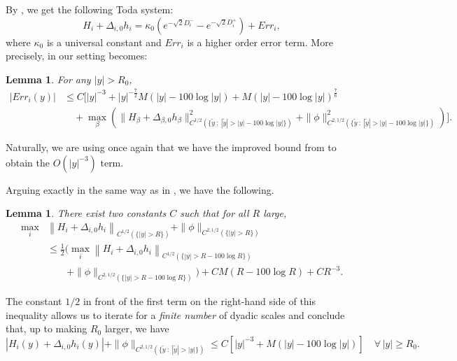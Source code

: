 \documentclass{article}
\newtheorem{lemma}[theorem]{Lemma}
\theoremstyle{definition}
\begin{document}

By \cite[Section 5]{WW19}, we get the following Toda system:
\begin{equation}\label{eq:todagluing}
H_i + \Delta_{i,0} h_i = \kappa_0 \left(e^{-\sqrt{2} D_i^-} - e^{-\sqrt{2} D_i^+} \right) + Err_i,
\end{equation}
where $\kappa_0$ is a universal constant and $Err_i$ is a higher order error term. More precisely, \cite[Lemma 5.1]{WW19} in our setting becomes:

\begin{lemma}\label{lem:88tgpbgbagu}
For any $|y| > R_0$,
\begin{align*}
|Err_i(y)| &\leq C\Big[ |y|^{-3} + |y|^{-\frac{7}{2}} M(|y| - 100\log |y|) + M(|y| - 100 \log |y|)^{\frac{7}{6}}\\
&\quad + \max_\beta \left( \|H_\beta + \Delta_{\beta,0} h_\beta\|_{C^{1/2}(\{\widetilde y\ :\ |\widetilde y|>|y| - 100 \log |y|\})}^2 + \|\phi\|_{C^{2,1/2}(\{\widetilde y\ :\ |\widetilde y|>|y| - 100 \log |y|\})}^2 \right)\Big].
\end{align*}
\end{lemma}
Naturally, we are using once again that we have the improved bound from  to obtain the $O(|y|^{-3})$ term.\\


Arguing exactly in the same way as in \cite[Section 6]{WW19}, we have the following.

\begin{lemma}\label{lem:9qbiuvfhs}
There exist two constants $C$ such that for all $R$ large,
\begin{align*}
    \max_i &\left\| H_i + \Delta_{i,0} h_i \right\|_{C^{1/2}(\{|y|>R\})} + \|\phi\|_{C^{2,1/2}(\{ |y|>R\})}\\
    &\leq \frac{1}{2} \Big(\max_i \left\| H_i+ \Delta_{i,0} h_i \right\|_{C^{1/2}(\{|y|>R - 100 \log R\})}\\
    &\qquad+ \|\phi\|_{C^{2,1/2}(\{|y|>R - 100 \log R\})}\Big) 
+ CM(R - 100 \log R) + C R^{-3}.
\end{align*}
\end{lemma}

The constant $1/2$ in front of the first term on the right-hand side of this inequality allows us to iterate for a \textit{finite number} of dyadic scales and conclude that, up to making $R_0$ larger, we have
\begin{equation}\label{eq:90124htp2}
    |H_i(y) + \Delta_{i,0} h_i(y)| + \|\phi\|_{C^{2,1/2}(\{\widetilde y\ :\ |\widetilde y|>|y|\})} \leq C \left[|y|^{-3} + M(|y| - 100 \log |y|)\right] \quad \forall\, |y| \geq R_0.
\end{equation}
\end{document}
